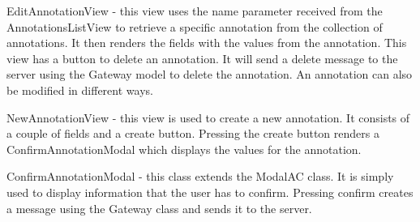 EditAnnotationView - this view uses the name parameter received from the AnnotationsListView to retrieve a specific annotation from the collection of annotations. It then renders the fields with the values from the annotation. This view has a button to delete an annotation. It will send a delete message to the server using the Gateway model to delete the annotation. An annotation can also be modified in different ways.

NewAnnotationView - this view is used to create a new annotation. It consists of a couple of fields and a create button. Pressing the create button renders a ConfirmAnnotationModal which displays the values for the annotation.

ConfirmAnnotationModal - this class extends the ModalAC class. It is simply used to display information that the user has to confirm. Pressing confirm creates a message using the Gateway class and sends it to the server.
